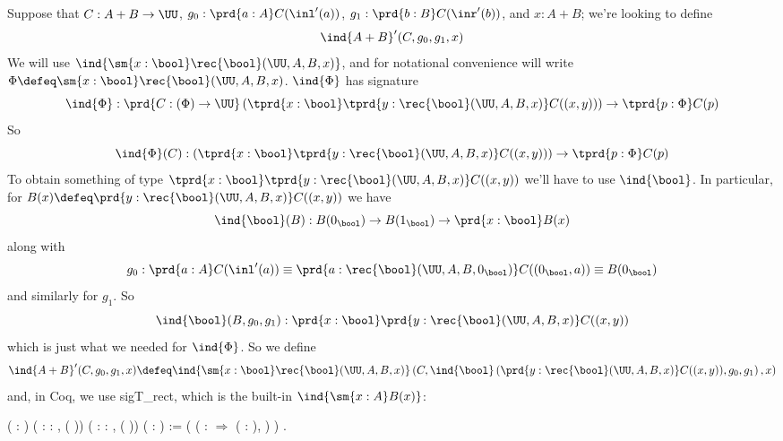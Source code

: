 Suppose that $C : A + B \to \UU$, $g_{0} : \prd{a:A} C(\inl'(a))$, $g_{1} :
\prd{b:B} C(\inr'(b))$, and $x : A+B$; we're looking to define
\[
  \ind{A+B}'(C, g_{0}, g_{1}, x)
\]
We will use $\ind{\sm{x:\bool}\rec{\bool}(\UU, A, B, x)}$, and for notational
convenience will write $\Phi \defeq \sm{x:\bool}\rec{\bool}(\UU, A, B, x)$.
$\ind{\Phi}$ has signature
\[
  \ind{\Phi} :
  \prd{C : (\Phi) \to \UU}
  \left(\tprd{x:\bool}\tprd{y:\rec{\bool}(\UU, A, B, x)}C((x, y))\right)
  \to
  \tprd{p:\Phi} C(p)
\]
So
\[
  \ind{\Phi}(C) : 
  \left(\tprd{x:\bool}\tprd{y:\rec{\bool}(\UU, A, B, x)}C((x, y))\right)
  \to
  \tprd{p:\Phi} C(p)
\]
To obtain something of type $\tprd{x:\bool}\tprd{y:\rec{\bool}(\UU, A, B,
  x)}C((x, y))$ we'll have to use $\ind{\bool}$.  In particular, for $B(x)
\defeq\prd{y:\rec{\bool}(\UU, A, B, x)}C((x, y))$ we have
\[
  \ind{\bool}(B)
  :
  B(0_{\bool})
  \to
  B(1_{\bool})
  \to
  \prd{x:\bool}
  B(x)
\]
along with
\[
  g_{0} :
  \prd{a:A} C(\inl'(a))
  \equiv
  \prd{a:\rec{\bool}(\UU, A, B, 0_{\bool})} C((0_{\bool}, a))
  \equiv
  B(0_{\bool})
\]
and similarly for $g_{1}$.  So
\[
  \ind{\bool}(B, g_{0}, g_{1}) : \prd{x:\bool}\prd{y:\rec{\bool}(\UU, A, B, x)}
  C((x, y))
\]
which is just what we needed for $\ind{\Phi}$.  So we define
\[
  \ind{A+B}'(C, g_{0}, g_{1}, x)
  \defeq
  \ind{\sm{x:\bool}\rec{\bool}(\UU, A, B, x)}\left(
    C,
    \ind{\bool}\left(
      \prd{y:\rec{\bool}(\UU, A, B, x)} C((x, y)),
      g_{0},
      g_{1}
    \right),
    x
  \right)
\]
and, in Coq, we use sigT\_rect, which is the built-in
$\ind{\sm{x:A}B(x)}$: \begin{coqdoccode}
\coqdocemptyline
\coqdocnoindent
{}  ( :   ) ( : \coqdockw{\ensuremath{\forall}}  : ,  ( )) ( : \coqdockw{\ensuremath{\forall}}  : ,  ( )) ( : ) \coqdoceol
\coqdocnoindent
:= \coqdoceol
\coqdocnoindent
{}  ( ( : \ensuremath{\Rightarrow} \coqdockw{\ensuremath{\forall}} ( :      ),  \coqdocnotation{(}\coqdocnotation{;} \coqdocnotation{)})  ) .\coqdoceol
\coqdocemptyline
\end{coqdoccode}


